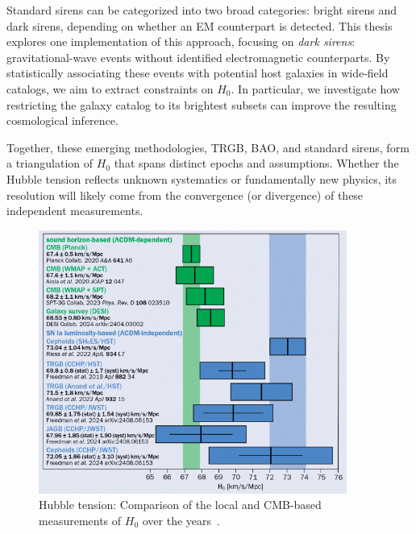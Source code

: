 \begin{itemize}
    Standard sirens can be categorized into two broad categories: bright sirens and dark sirens, depending on whether an \ac{EM} counterpart is detected. This thesis explores one implementation of this approach, focusing on \textit{dark sirens}: gravitational-wave events without identified electromagnetic counterparts. By statistically associating these events with potential host galaxies in wide-field catalogs, we aim to extract constraints on $H_0$. In particular, we investigate how restricting the galaxy catalog to its brightest subsets can improve the resulting cosmological inference.
\end{itemize}

Together, these emerging methodologies, TRGB, BAO, and standard sirens, form a triangulation of $H_0$ that spans distinct epochs and assumptions. Whether the Hubble tension reflects unknown systematics or fundamentally new physics, its resolution will likely come from the convergence (or divergence) of these independent measurements.

\begin{figure}[h!]
    \centering
    \includegraphics[width=0.9\textwidth]{figures/CCMarApr25_Hubble_tension.jpg}
    \caption[Hubble tension: local vs. \ac{CMB}-based $H_0$ measurements.]{Hubble tension: Comparison of the local and \ac{CMB}-based measurements of $H_0$ over the years~\citep{cern2025}.}
    \label{fig:hubble_tension}
\end{figure}

